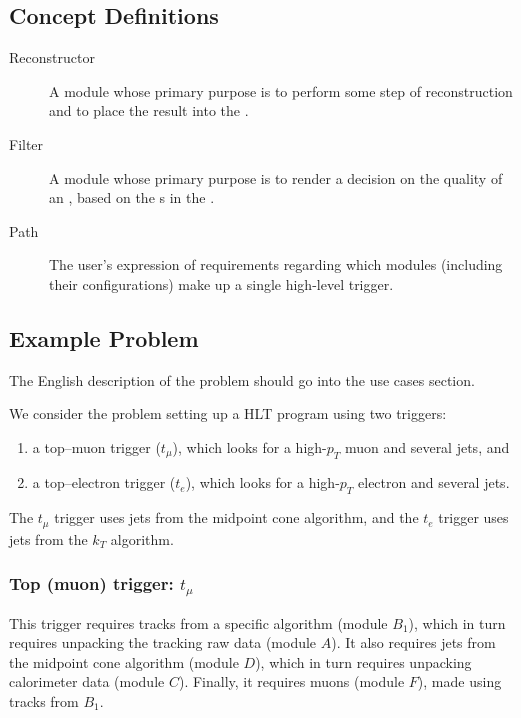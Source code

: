 \documentclass[draftmode]{memarticle}
\newcommand{\EDProduct}{\classname{ED\-Product}}
\newcommand{\Event}{\classname{Event}}
\begin{document}
\subsection{Concept Definitions}
\begin{description}

\item[Reconstructor]

A module whose primary purpose
is to perform some step of reconstruction
and to place the result into the \Event.

\item[Filter]

A module whose primary purpose
is to render a decision on the quality of an \Event,
based on the \EDProduct{}s in the \Event.

\item[Path]

The user's expression
of requirements
regarding which modules
(including their configurations)
make up a single high-level trigger.

\end{description}

\subsection{Example Problem}

\begin{fixme}
The English description of the problem should go into the use cases section.
\end{fixme}

We consider the problem setting up a HLT program using two triggers:
\begin{enumerate}
\item a top--muon trigger ($t_\mu$), which looks for a high-$p_T$ muon and several jets, and
\item a top--electron trigger ($t_e$), which looks for a high-$p_T$ electron and several jets.
\end{enumerate}

The $t_\mu$ trigger uses jets from the midpoint cone algorithm,
and the $t_e$ trigger uses jets from the $k_T$ algorithm.

\subsubsection{\texorpdfstring{Top (muon) trigger: $t_{\mu}$}{Top (muon) trigger}}

This trigger requires tracks from a specific algorithm (module $B_1$),
which in turn requires unpacking the tracking raw data (module $A$).
It also requires jets from the midpoint cone algorithm (module $D$),
which in turn requires unpacking calorimeter data (module $C$).
Finally, it requires muons (module $F$), made using tracks from $B_1$.
\end{document}
